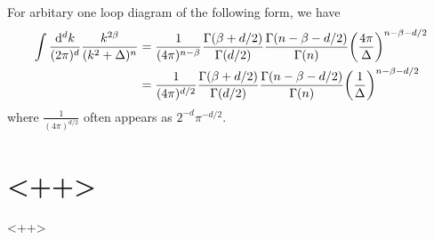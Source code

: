\documentclass{article}
\newcommand{\vbk}{\vb{k}}
\renewcommand{\a}{\alpha}
\renewcommand{\b}{\beta}
\begin{document}
\begin{appendices}
  For arbitary one loop diagram of the following form, we have
  \begin{subequations} \label{1loopgamma}
	\begin{align}
	  \int\frac{\dd^dk}{(2\pi)^d}\frac{k^{2\b}}{(k^2+\Delta)^n}&=\frac{1}{(4\pi)^{n-\b}}\frac{\Gamma(\b+d/2)}{\Gamma(d/2)}\frac{\Gamma(n-\b-d/2)}{\Gamma(n)}\pqty{\frac{4\pi}{\Delta}}^{n-\b-d/2}\\
	  &=\frac{1}{(4\pi)^{d/2}}\frac{\Gamma(\b+d/2)}{\Gamma(d/2)}\frac{\Gamma(n-\b-d/2)}{\Gamma(n)}\pqty{\frac{1}{\Delta}}^{n-\b-d/2}
	\end{align}
  \end{subequations}
  where $\frac{1}{(4\pi)^{d/2}}$ often appears as $2^{-d}\pi^{-d/2}$.
  \section{<++>}<++>
\end{appendices}
\end{document}
